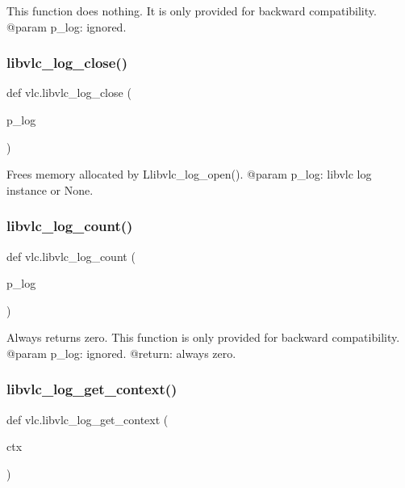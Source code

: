 \begin{DoxyVerb}This function does nothing.
It is only provided for backward compatibility.
@param p_log: ignored.
\end{DoxyVerb}
 \mbox{\label{namespacevlc_a403030949bc4a5343c6a01b162395981}} 
\subsubsection{\texorpdfstring{libvlc\+\_\+log\+\_\+close()}{libvlc\_log\_close()}}
{\footnotesize\ttfamily def vlc.\+libvlc\+\_\+log\+\_\+close (\begin{DoxyParamCaption}\item[{}]{p\+\_\+log }\end{DoxyParamCaption})}

\begin{DoxyVerb}Frees memory allocated by L{libvlc_log_open}().
@param p_log: libvlc log instance or None.
\end{DoxyVerb}
 \mbox{\label{namespacevlc_a9743e8e0f94d5dc4855f541f9d736d7c}} 
\subsubsection{\texorpdfstring{libvlc\+\_\+log\+\_\+count()}{libvlc\_log\_count()}}
{\footnotesize\ttfamily def vlc.\+libvlc\+\_\+log\+\_\+count (\begin{DoxyParamCaption}\item[{}]{p\+\_\+log }\end{DoxyParamCaption})}

\begin{DoxyVerb}Always returns zero.
This function is only provided for backward compatibility.
@param p_log: ignored.
@return: always zero.
\end{DoxyVerb}
 \mbox{\label{namespacevlc_a9694de9d8c9b9070e0108982c90dd379}} 
\subsubsection{\texorpdfstring{libvlc\+\_\+log\+\_\+get\+\_\+context()}{libvlc\_log\_get\_context()}}
{\footnotesize\ttfamily def vlc.\+libvlc\+\_\+log\+\_\+get\+\_\+context (\begin{DoxyParamCaption}\item[{}]{ctx }\end{DoxyParamCaption})}

